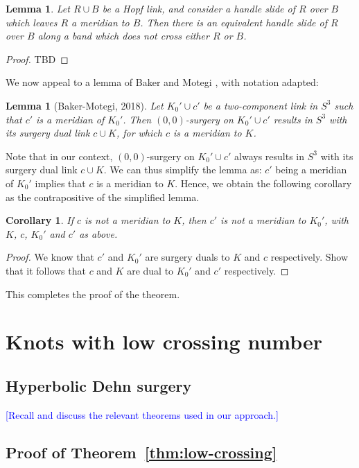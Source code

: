 \documentclass[11pt,usenames,dvipsnames,reqno]{amsart}
\numberwithin{theorem}{section}
\newtheorem{corollary}[theorem]{Corollary}
\newtheorem{lemma}[theorem]{Lemma}
\theoremstyle{ex}
\theoremstyle{rem}
\def\kh#1{\textcolor{Blue}{#1}}
\begin{document}
\begin{lemma}
	Let $R\cup B$ be a Hopf link, and consider a handle slide of $R$ over $B$ which leaves $R$ a meridian to $B$. Then there is an equivalent handle slide of $R$ over $B$ along a band which does not cross either $R$ or $B$.
\end{lemma}
\begin{proof}
	TBD
\end{proof}

We now appeal to a lemma of Baker and Motegi \cite[Lemma 2.4]{baker-motegi}, with notation adapted:

\begin{lemma}[Baker-Motegi, 2018]
	Let $K_0'\cup c'$ be a two-component link in $S^3$ such that $c'$ is a meridian of $K_0'$. Then $(0,0)$-surgery on $K_0'\cup c'$ results in $S^3$ with its surgery dual link $c\cup K$, for which $c$ is a meridian to $K$.
\end{lemma}

Note that in our context, $(0,0)$-surgery on $K_0'\cup c'$ always results in $S^3$ with its surgery dual link $c\cup K$. We can thus simplify the lemma as: $c'$ being a meridian of $K_0'$ implies that $c$ is a meridian to $K$. Hence, we obtain the following corollary as the contrapositive of the simplified lemma. 

\begin{corollary}
	If $c$ is not a meridian to $K$, then $c'$ is not a meridian to $K_0'$, with $K$, $c$, $K_0'$ and $c'$ as above. 
\end{corollary}

\begin{proof}
	We know that $c'$ and $K_0'$ are surgery duals to $K$ and $c$ respectively. Show that it follows that $c$ and $K$ are dual to $K_0'$ and $c'$ respectively.
\end{proof}
This completes the proof of the theorem.

\section{Knots with low crossing number}

\subsection{Hyperbolic Dehn surgery} \kh{[Recall and discuss the relevant theorems used in our approach.]}

\subsection{Proof of Theorem~\ref{thm:low-crossing}}
\end{document}
